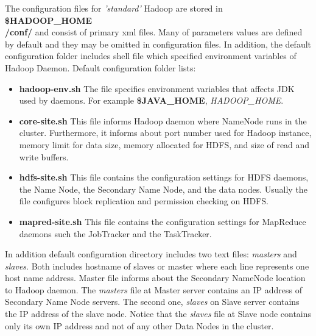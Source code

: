 \documentclass[a4paper,12pt,oneside]{report}
\begin{document}
	The configuration files for \textit{'standard'} Hadoop are stored in
	\textbf{\$HADOOP\_HOME\\/conf/} and consist of primary xml files. Many of parameters values  
	are defined by default and they may be omitted in configuration files. 
	In addition, the default configuration folder includes shell file which specified environment variables of Hadoop Daemon. Default configuration folder lists:
	\begin{itemize}\label{conf_files}
		\item \textbf{hadoop-env.sh} The file specifies environment variables that
		affects JDK used by daemons. For example \textbf{\$JAVA\_HOME}, \textit{HADOOP\_HOME}.
		\item \textbf{core-site.sh}   This file informs Hadoop daemon where NameNode
		runs in the cluster. Furthermore, it  
		informs about port number used for Hadoop instance, memory limit for data
		size,  memory allocated for HDFS, and size of read and write buffers.
		\item \textbf{hdfs-site.sh}  This file contains the configuration settings for
		HDFS daemons, the Name Node, the Secondary Name Node, and the data nodes. 
		Usually the file configures block replication and permission checking on HDFS. 
		\item \textbf{mapred-site.sh}  This file contains the configuration settings for
		MapReduce daemons such the JobTracker and the TaskTracker.
	\end{itemize}
	
	In addition default configuration directory includes two text files:
	\textit{masters} and \textit{slaves}. Both includes hostname of slaves or master 
	where each line represents one host name address. 
	Master file informs about the Secondary NameNode location to Hadoop daemon. The
	\textit{masters} file at Master server contains an IP address of Secondary Name Node servers.
	The second one, \textit{slaves} on Slave server contains the IP address of the
	slave node. Notice that the \textit{slaves} file at Slave node contains only its
	own IP address and not of any other Data Nodes in the cluster.
	
	
\end{document}
